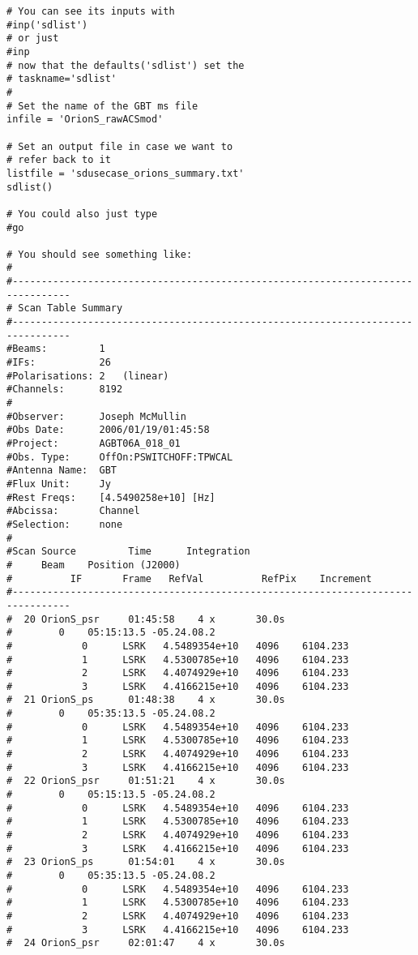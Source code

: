 \begin{verbatim}
# You can see its inputs with
#inp('sdlist')
# or just
#inp
# now that the defaults('sdlist') set the
# taskname='sdlist'
#
# Set the name of the GBT ms file
infile = 'OrionS_rawACSmod'

# Set an output file in case we want to
# refer back to it
listfile = 'sdusecase_orions_summary.txt'
sdlist()

# You could also just type
#go

# You should see something like:
#
#--------------------------------------------------------------------------------
# Scan Table Summary
#--------------------------------------------------------------------------------
#Beams:         1   
#IFs:           26  
#Polarisations: 2   (linear)
#Channels:      8192
#
#Observer:      Joseph McMullin
#Obs Date:      2006/01/19/01:45:58
#Project:       AGBT06A_018_01
#Obs. Type:     OffOn:PSWITCHOFF:TPWCAL
#Antenna Name:  GBT
#Flux Unit:     Jy
#Rest Freqs:    [4.5490258e+10] [Hz]
#Abcissa:       Channel
#Selection:     none
#
#Scan Source         Time      Integration       
#     Beam    Position (J2000)
#          IF       Frame   RefVal          RefPix    Increment   
#--------------------------------------------------------------------------------
#  20 OrionS_psr     01:45:58    4 x       30.0s
#        0    05:15:13.5 -05.24.08.2
#            0      LSRK   4.5489354e+10   4096    6104.233
#            1      LSRK   4.5300785e+10   4096    6104.233
#            2      LSRK   4.4074929e+10   4096    6104.233
#            3      LSRK   4.4166215e+10   4096    6104.233
#  21 OrionS_ps      01:48:38    4 x       30.0s
#        0    05:35:13.5 -05.24.08.2
#            0      LSRK   4.5489354e+10   4096    6104.233
#            1      LSRK   4.5300785e+10   4096    6104.233
#            2      LSRK   4.4074929e+10   4096    6104.233
#            3      LSRK   4.4166215e+10   4096    6104.233
#  22 OrionS_psr     01:51:21    4 x       30.0s
#        0    05:15:13.5 -05.24.08.2
#            0      LSRK   4.5489354e+10   4096    6104.233
#            1      LSRK   4.5300785e+10   4096    6104.233
#            2      LSRK   4.4074929e+10   4096    6104.233
#            3      LSRK   4.4166215e+10   4096    6104.233
#  23 OrionS_ps      01:54:01    4 x       30.0s
#        0    05:35:13.5 -05.24.08.2
#            0      LSRK   4.5489354e+10   4096    6104.233
#            1      LSRK   4.5300785e+10   4096    6104.233
#            2      LSRK   4.4074929e+10   4096    6104.233
#            3      LSRK   4.4166215e+10   4096    6104.233
#  24 OrionS_psr     02:01:47    4 x       30.0s

\end{verbatim}
